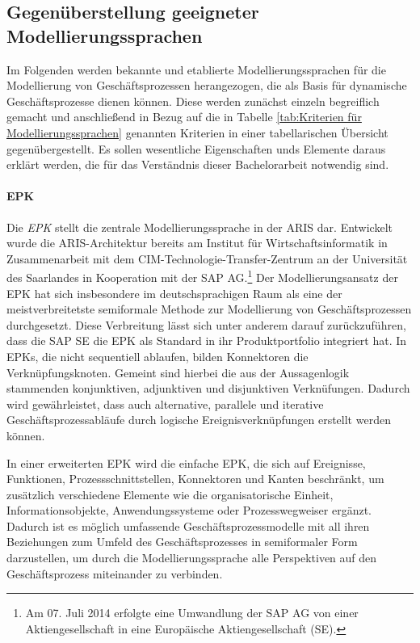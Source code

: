\subsection{Gegenüberstellung geeigneter Modellierungssprachen}
Im Folgenden werden bekannte und etablierte Modellierungssprachen für die Modellierung von Geschäftsprozessen herangezogen, die als Basis für dynamische Geschäftsprozesse dienen können. 
Diese werden zunächst einzeln begreiflich gemacht und anschließend in Bezug auf die in Tabelle \ref{tab:Kriterien für Modellierungssprachen} genannten Kriterien in einer tabellarischen Übersicht gegenübergestellt. 
Es sollen wesentliche Eigenschaften unds Elemente daraus erklärt werden, die für das Verständnis dieser Bachelorarbeit notwendig sind.

\paragraph{\acl{EPK}}
Die \textit{\acf{EPK}} stellt die zentrale Modellierungssprache in der \acf{ARIS} dar.
Entwickelt wurde die \ac{ARIS}-Architektur bereits \citeyear{Scheer.1991} am Institut für Wirtschaftsinformatik in Zusammenarbeit mit dem \ac{CIM}-Technologie-Transfer-Zentrum an der Universität des Saarlandes in Kooperation mit der SAP AG.\footnote{Am 07. Juli 2014 erfolgte eine Umwandlung der SAP AG von einer Aktiengesellschaft in eine Europäische Aktiengesellschaft (SE).}
\cite{Scheer.1991}
Der Modellierungsansatz der \ac{EPK} hat sich insbesondere im deutschsprachigen Raum als eine der meistverbreitetste semiformale Methode zur Modellierung von Geschäftsprozessen durchgesetzt. 
\cite{Gadatsch.2013}
Diese Verbreitung lässt sich unter anderem darauf zurückzuführen, dass die SAP SE die \ac{EPK} als Standard in ihr Produktportfolio integriert hat. 
\cite{Staud.2006}
In \ac{EPK}s, die nicht sequentiell ablaufen, bilden Konnektoren die Verknüpfungsknoten. Gemeint sind hierbei die aus der Aussagenlogik stammenden konjunktiven, adjunktiven und disjunktiven Verknüfungen. Dadurch wird gewährleistet, dass auch alternative, parallele und iterative Geschäftsprozessabläufe durch logische Ereignisverknüpfungen erstellt werden können.
\cite{Lehmann.2008}

In einer erweiterten \ac{EPK} wird die einfache \ac{EPK}, die sich auf Ereignisse, Funktionen, Prozessschnittstellen, Konnektoren und Kanten beschränkt, um zusätzlich verschiedene Elemente wie die organisatorische Einheit, Informationsobjekte, Anwendungssysteme oder Prozesswegweiser ergänzt. 
\cite{Seidlmeier.2015}
Dadurch ist es möglich umfassende Geschäftsprozessmodelle mit all ihren Beziehungen zum Umfeld des Geschäftsprozesses in semiformaler Form darzustellen, um durch die Modellierungssprache alle Perspektiven auf den Geschäftsprozess miteinander zu verbinden.
\cite{Gadatsch.2013}

